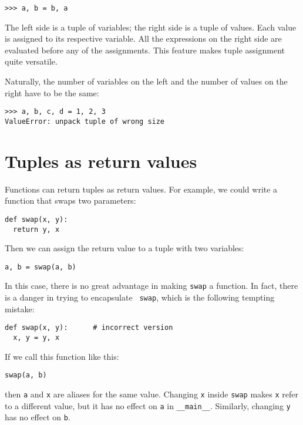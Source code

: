 \beforeverb
\begin{verbatim}
>>> a, b = b, a
\end{verbatim}
\afterverb
%
The left side is a tuple of variables; the right side is a tuple of
values.  Each value is assigned to its respective variable.  
All the expressions on the right side are evaluated before any
of the assignments.
This feature makes tuple
assignment quite versatile.

Naturally, the number of variables on the left and the number of
values on the right have to be the same:

\beforeverb
\begin{verbatim}
>>> a, b, c, d = 1, 2, 3
ValueError: unpack tuple of wrong size
\end{verbatim}
\afterverb
%

\section{Tuples as return values}

Functions can return tuples as return values.  For example, we could
write a function that swaps two parameters:

\beforeverb
\begin{verbatim}
def swap(x, y):
  return y, x
\end{verbatim}
\afterverb
%
Then we can assign the return value to a
tuple with two variables:

\beforeverb
\begin{verbatim}
a, b = swap(a, b)
\end{verbatim}
\afterverb
%
In this case, there is no great advantage in making {\tt swap} a
function.  In fact, there is a danger in trying to encapsulate {\tt
swap}, which is the following tempting mistake:

\beforeverb
\begin{verbatim}
def swap(x, y):      # incorrect version
  x, y = y, x
\end{verbatim}
\afterverb
%
If we call this function like this:

\beforeverb
\begin{verbatim}
swap(a, b)
\end{verbatim}
\afterverb
%
then {\tt a} and {\tt x} are aliases for the same value.  Changing {\tt x}
inside {\tt swap} makes {\tt x} refer to a different value, but it has no
effect on {\tt a} in {\tt \_\_main\_\_}.  Similarly, changing {\tt y} has no
effect on {\tt b}.


